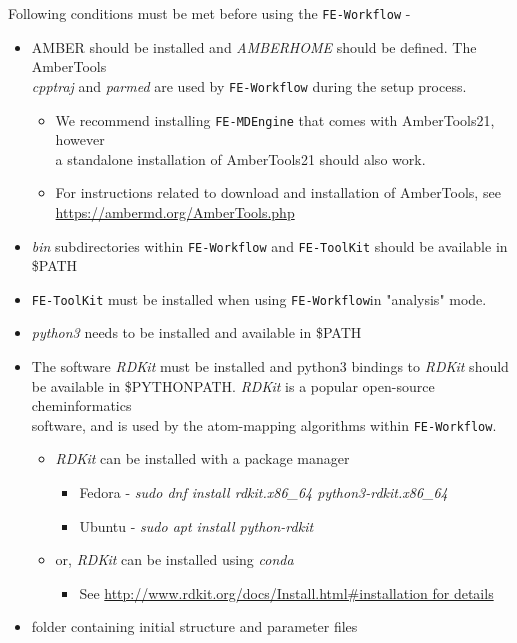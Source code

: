 \documentclass[11pt,letterpaper,titlepage]{article}
\newcommand{\addb}{\texttt{FE-MDEngine}}
\newcommand{\tk}{\texttt{FE-ToolKit}}
\newcommand{\wf}{\texttt{FE-Workflow}}
\begin{document}
Following conditions must be met before using the \wf{} -
\begin{itemize}
	\item{AMBER should be installed and \textit{AMBERHOME} should be defined. The AmberTools \\
		\textit{cpptraj} and \textit{parmed} are used by \wf{} during the setup process.}
		\begin{itemize}
			\item We recommend installing \addb{} that comes with AmberTools21, however \\
				a standalone installation of AmberTools21 should also work.
			\item For instructions related to download and installation of AmberTools, see \\
				\url{https://ambermd.org/AmberTools.php}
		\end{itemize}
	\item{\textit{bin} subdirectories within \wf{} and \tk{} should be available in \$PATH}
	\item{\tk{} must be installed when using \wf in "analysis" mode.}
	\item{\textit{python3} needs to be installed and available in \$PATH}
	\item{The software \textit{RDKit} must be installed and python3 bindings to \textit{RDKit} should \\ 
		be available in \$PYTHONPATH. \textit{RDKit} is a popular open-source cheminformatics \\
		software, and is used by the atom-mapping algorithms within \wf{}.}
	\begin{itemize}
		\item{\textit{RDKit} can be installed with a package manager}
		\begin{itemize}
			\item{Fedora - \textit{sudo dnf install rdkit.x86\_64 python3-rdkit.x86\_64}}
			\item{Ubuntu - \textit{sudo apt install python-rdkit}}
		\end{itemize}
		\item{or, \textit{RDKit} can be installed using \textit{conda}}
		\begin{itemize}
			\item{See \url{http://www.rdkit.org/docs/Install.html\#installation for details}}
		\end{itemize}
	\end{itemize}
	\item{folder containing initial structure and parameter files}

\end{itemize}
\end{document}
